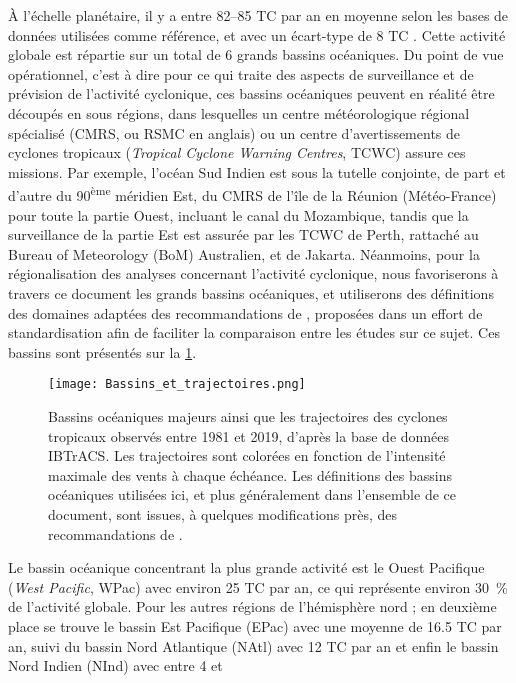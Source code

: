 \documentclass[../main.tex]{subfiles}
\begin{document}
À l'échelle planétaire, il y a entre \numrange[range-phrase ={ et }]{82}{85} TC par an en moyenne selon les bases de données utilisées comme référence, et avec
un écart-type de \num{8} TC \parencite{schreck_impact_2014}. Cette activité globale est répartie sur un total de \num{6} grands bassins océaniques. Du point de
vue opérationnel, c'est à dire pour ce qui traite des aspects de surveillance et de prévision de l'activité cyclonique, ces bassins océaniques peuvent en
réalité être découpés en sous régions, dans lesquelles un centre météorologique régional spécialisé (CMRS, ou RSMC en anglais) ou un centre d'avertissements de
cyclones tropicaux (\textit{Tropical Cyclone Warning Centres}, TCWC) assure ces missions. Par exemple, l'océan Sud Indien est sous la tutelle conjointe, de part
et d'autre du 90\textsuperscript{ème} méridien Est, du CMRS de l'île de la Réunion (Météo-France) pour toute la partie Ouest, incluant le canal du Mozambique,
tandis que la surveillance de la partie Est est assurée par les TCWC de Perth, rattaché au Bureau of Meteorology (BoM) Australien, et de Jakarta. Néanmoins,
pour la régionalisation des analyses concernant l'activité cyclonique, nous favoriserons à travers ce document les grands bassins océaniques, et utiliserons des
définitions des domaines adaptées des recommandations de \cite{knutson_tropical_2020}, proposées dans un effort de standardisation afin de faciliter la
comparaison entre les études sur ce sujet. Ces bassins sont présentés sur la \cref{fig:bassins_TC}.
%
\begin{figure}[t]
    \centering
    \texttt{[image: Bassins\_et\_trajectoires.png]}
    \caption{Bassins océaniques majeurs ainsi que les trajectoires des cyclones tropicaux observés entre 1981 et 2019, d'après la base de données
    \hbox{IBTrACS}. Les trajectoires sont colorées en fonction de l'intensité maximale des vents à chaque échéance. Les définitions des bassins océaniques
    utilisées ici, et plus généralement dans l'ensemble de ce document, sont issues, à quelques modifications près, des recommandations de \hbox{\cite[documents
    supplémentaires]{knutson_tropical_2020}}.}
    \label{fig:bassins_TC}
\end{figure}
%
Le bassin océanique concentrant la plus grande activité est le Ouest Pacifique (\textit{West Pacific}, WPac) avec environ \num{25} TC par an, ce qui représente
environ \SI{30}{\percent} de l'activité globale. Pour les autres régions de l'hémisphère nord ; en deuxième place se trouve le bassin Est Pacifique (EPac) avec
une moyenne de \num{16.5} TC par an, suivi du bassin Nord Atlantique (NAtl) avec \num{12} TC par an et enfin le bassin Nord Indien (NInd) avec entre \num{4} et
\end{document}
